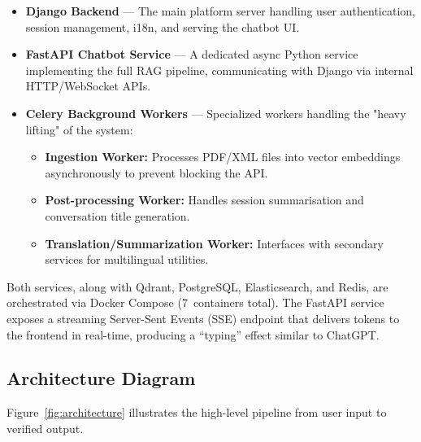 \documentclass[12pt, a4paper]{article}
\begin{document}
\begin{itemize}[leftmargin=2em]
  \item \textbf{Django Backend} --- The main platform server handling user
        authentication, session management, i18n, and serving the chatbot UI.
  \item \textbf{FastAPI Chatbot Service} --- A dedicated async Python service
        implementing the full RAG pipeline, communicating with Django via
        internal HTTP/WebSocket APIs.
  \item \textbf{Celery Background Workers} --- Specialized workers handling
        the "heavy lifting" of the system:
        \begin{itemize}
            \item \textbf{Ingestion Worker:} Processes PDF/XML files into vector embeddings asynchronously to prevent blocking the API.
            \item \textbf{Post-processing Worker:} Handles session summarisation and conversation title generation.
            \item \textbf{Translation/Summarization Worker:} Interfaces with secondary services for multilingual utilities.
        \end{itemize}
\end{itemize}

Both services, along with Qdrant, PostgreSQL, Elasticsearch, and Redis, are
orchestrated via Docker Compose (7~containers total). The FastAPI service
exposes a streaming Server-Sent Events (SSE) endpoint that delivers tokens
to the frontend in real-time, producing a ``typing'' effect similar to ChatGPT.

\subsection{Architecture Diagram}

Figure~\ref{fig:architecture} illustrates the high-level pipeline from user
input to verified output.
\end{document}
